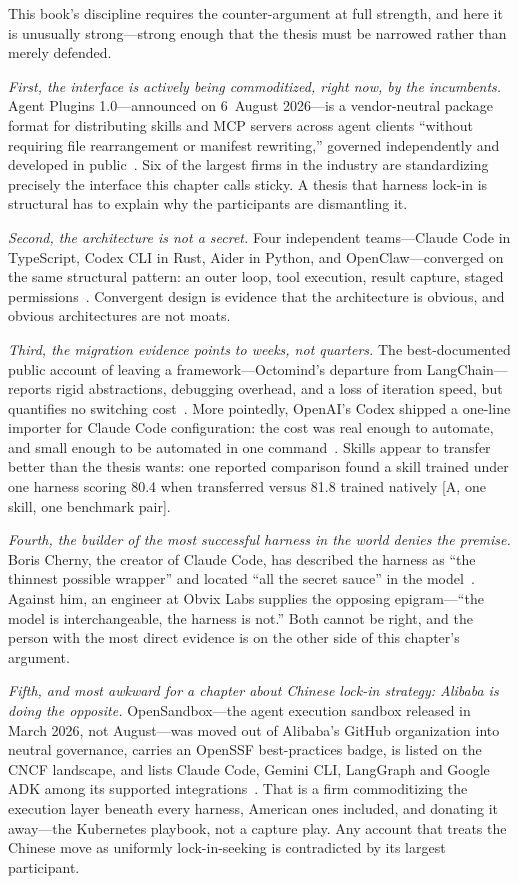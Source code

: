This book's discipline requires the counter-argument at full strength, and here it is unusually strong---strong enough that the thesis must be narrowed rather than merely defended.

\emph{First, the interface is actively being commoditized, right now, by the incumbents.} Agent Plugins 1.0---announced on 6~August 2026---is a vendor-neutral package format for distributing skills and MCP servers across agent clients ``without requiring file rearrangement or manifest rewriting,'' governed independently and developed in public~\cite{agent-plugins}. Six of the largest firms in the industry are standardizing precisely the interface this chapter calls sticky. A thesis that harness lock-in is structural has to explain why the participants are dismantling it.

\emph{Second, the architecture is not a secret.} Four independent teams---Claude Code in TypeScript, Codex CLI in Rust, Aider in Python, and OpenClaw---converged on the same structural pattern: an outer loop, tool execution, result capture, staged permissions~\cite{claude-code-anatomy}. Convergent design is evidence that the architecture is obvious, and obvious architectures are not moats.

\emph{Third, the migration evidence points to weeks, not quarters.} The best-documented public account of leaving a framework---Octomind's departure from LangChain---reports rigid abstractions, debugging overhead, and a loss of iteration speed, but quantifies no switching cost~\cite{octomind}. More pointedly, OpenAI's Codex shipped a one-line importer for Claude Code configuration: the cost was real enough to automate, and small enough to be automated in one command~\cite{harness-register}. Skills appear to transfer better than the thesis wants: one reported comparison found a skill trained under one harness scoring 80.4 when transferred versus 81.8 trained natively [A, one skill, one benchmark pair].

\emph{Fourth, the builder of the most successful harness in the world denies the premise.} Boris Cherny, the creator of Claude Code, has described the harness as ``the thinnest possible wrapper'' and located ``all the secret sauce'' in the model~\cite{harness-register}. Against him, an engineer at Obvix Labs supplies the opposing epigram---``the model is interchangeable, the harness is not.'' Both cannot be right, and the person with the most direct evidence is on the other side of this chapter's argument.

\emph{Fifth, and most awkward for a chapter about Chinese lock-in strategy: Alibaba is doing the opposite.} OpenSandbox---the agent execution sandbox released in March 2026, not August---was moved out of Alibaba's GitHub organization into neutral governance, carries an OpenSSF best-practices badge, is listed on the CNCF landscape, and lists Claude Code, Gemini CLI, LangGraph and Google ADK among its supported integrations~\cite{opensandbox}. That is a firm commoditizing the execution layer beneath every harness, American ones included, and donating it away---the Kubernetes playbook, not a capture play. Any account that treats the Chinese move as uniformly lock-in-seeking is contradicted by its largest participant.

